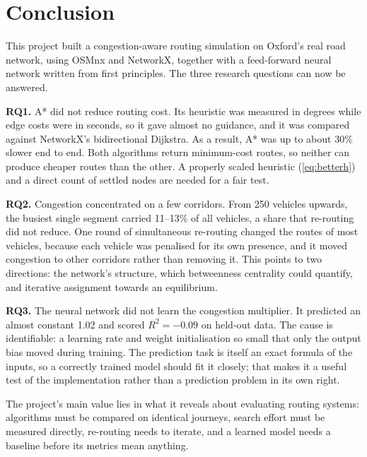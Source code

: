 \documentclass[12pt]{report}
\begin{document}

\chapter{Conclusion}
\label{ch:conclusion}

This project built a congestion-aware routing simulation on Oxford's real road network, using OSMnx and NetworkX, together with a feed-forward neural network written from first principles. The three research questions can now be answered.

\textbf{RQ1.} A* did not reduce routing cost. Its heuristic was measured in degrees while edge costs were in seconds, so it gave almost no guidance, and it was compared against NetworkX's bidirectional Dijkstra. As a result, A* was up to about 30\% slower end to end. Both algorithms return minimum-cost routes, so neither can produce cheaper routes than the other. A properly scaled heuristic (\cref{eq:betterh}) and a direct count of settled nodes are needed for a fair test.

\textbf{RQ2.} Congestion concentrated on a few corridors. From 250 vehicles upwards, the busiest single segment carried 11--13\% of all vehicles, a share that re-routing did not reduce. One round of simultaneous re-routing changed the routes of most vehicles, because each vehicle was penalised for its own presence, and it moved congestion to other corridors rather than removing it. This points to two directions: the network's structure, which betweenness centrality could quantify, and iterative assignment towards an equilibrium.

\textbf{RQ3.} The neural network did not learn the congestion multiplier. It predicted an almost constant 1.02 and scored $R^2 = -0.09$ on held-out data. The cause is identifiable: a learning rate and weight initialisation so small that only the output bias moved during training. The prediction task is itself an exact formula of the inputs, so a correctly trained model should fit it closely; that makes it a useful test of the implementation rather than a prediction problem in its own right.

The project's main value lies in what it reveals about evaluating routing systems: algorithms must be compared on identical journeys, search effort must be measured directly, re-routing needs to iterate, and a learned model needs a baseline before its metrics mean anything.
\end{document}

